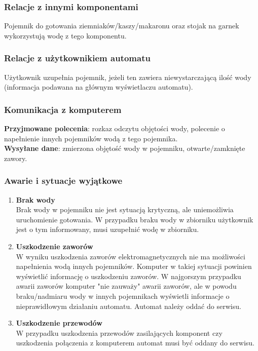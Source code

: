 \documentclass[12pt,a4paper,notitlepage]{article}
\begin{document}
\subsubsection{Relacje z innymi komponentami}
Pojemnik do gotowania ziemniaków/kaszy/makaronu oraz stojak na garnek wykorzystują wodę z tego komponentu.

\subsubsection{Relacje z użytkownikiem automatu}
Użytkownik uzupełnia pojemnik, jeżeli ten zawiera niewystarczającą ilość wody (informacja podawana na głównym wyświetlaczu automatu).

\subsubsection{Komunikacja z komputerem}
\textbf{Przyjmowane polecenia}: rozkaz odczytu objętości wody, polecenie o napełnienie innych pojemników wodą z tego pojemnika.\\
\textbf{Wysyłane dane}: zmierzona objętość wody w pojemniku, otwarte/zamknięte zawory.

\subsubsection{Awarie i sytuacje wyjątkowe}
\begin{enumerate}
  \item \textbf{Brak wody}\\
Brak wody w pojemniku nie jest sytuacją krytyczną, ale uniemożliwia uruchomienie gotowania. W przypadku braku wody w zbiorniku użytkownik jest o tym informowany, musi uzupełnić wodę w zbiorniku.
  \item \textbf{Uszkodzenie zaworów}\\
W wyniku uszkodzenia zaworów elektromagnetycznych nie ma możliwości napełnienia wodą innych pojemników. Komputer w takiej sytuacji powinien wyświetlić informację o uszkodzeniu zaworów. W najgorszym przypadku awarii zaworów komputer "nie zauważy" awarii zaworów, ale w powodu braku/nadmiaru wody w innych pojemnikach wyświetli informacje o nieprawidłowym działaniu automatu. Automat należy oddać do serwisu.
  \item \textbf{Uszkodzenie przewodów}\\
W przypadku uszkodzenia przewodów zasilających komponent czy uszkodzenia połączenia z komputerem automat musi być oddany do serwisu.
\end{enumerate}
\end{document}
